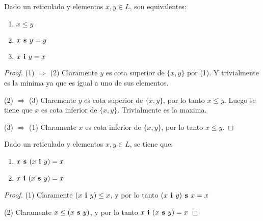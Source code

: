 \begin{lemma}
  Dado un reticulado \reticul y elementos $x, y \in L$, son equivalentes:
  \begin{enumerate}
    \item $x \leq y$
    \item $x\textbf{ s }y = y$
    \item $x\textbf{ i }y = x$
  \end{enumerate}
\end{lemma}
\begin{proof}
  (1) $\Rightarrow$ (2) Claramente $y$ es cota superior de $\{x, y\}$ por (1). Y trivialmente es la minima ya que es igual a uno de sus elementos.

  (2) $\Rightarrow$ (3) Claremente $y$ es cota superior de $\{x, y\}$, por lo tanto $x \leq y$. Luego se tiene que $x$ es cota inferior de $\{x, y\}$. Trivialmente es la maxima.

  (3) $\Rightarrow$ (1) Claramente $x$ es cota inferior de $\{x, y\}$, por lo tanto $x \leq y$.
\end{proof}

\begin{lemma}
  Dado un reticulado \reticul y elementos $x, y \in L$, se tiene que:
  \begin{enumerate}
    \item $x\textbf{ s }(x\textbf{ i }y) = x$
    \item $x\textbf{ i }(x\textbf{ s }y) = x$
  \end{enumerate}
\end{lemma}
\begin{proof}
  (1) Claramente $(x\textbf{ i }y) \leq x$, y por lo tanto $(x\textbf{ i }y)\textbf{ s }x = x$

  (2) Claramente $x \leq (x\textbf{ s }y)$, y por lo tanto $x\textbf{ i }(x\textbf{ s }y) = x$
\end{proof}

